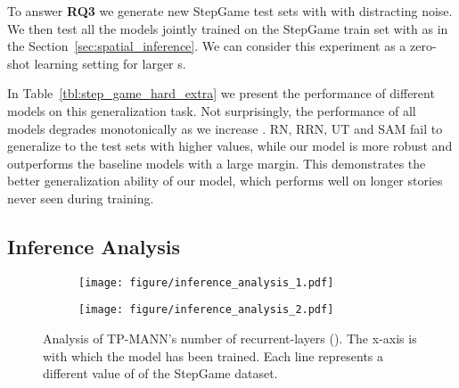 \documentclass[letterpaper]{article} \usepackage{aaai22}  \usepackage{times}  \usepackage{helvet}  \usepackage{courier}  \usepackage[hyphens]{url}  \usepackage{graphicx} \urlstyle{rm} \def\UrlFont{\rm}  \usepackage{natbib}  \usepackage{caption} \DeclareCaptionStyle{ruled}{labelfont=normalfont,labelsep=colon,strut=off} \frenchspacing  \setlength{\pdfpagewidth}{8.5in}  \setlength{\pdfpageheight}{11in}  \usepackage{algorithm}
\begin{document}
To answer \textbf{RQ3} 
we generate new StepGame test sets with  with distracting noise. 
We then test all the models jointly trained on the StepGame train set with  as in the Section~\ref{sec:spatial_inference}. We can consider this experiment as a zero-shot learning setting for larger s. 

In Table~\ref{tbl:step_game_hard_extra} we present the performance of different models on this generalization task. Not surprisingly, the performance of all models degrades monotonically as we increase . RN, RRN, UT and SAM fail to generalize to the test sets with higher  values, while our model is more robust and outperforms the baseline models with a large margin. This demonstrates the better generalization ability of our model, which performs well on longer stories never seen during training. 

\subsection{Inference Analysis}




\begin{figure}[!t]
\centering
\begin{subfigure}
        \centering
        \texttt{[image: figure/inference\_analysis\_1.pdf]}
        \label{fig:sub1}
    \end{subfigure}
\begin{subfigure}
        \centering
        \texttt{[image: figure/inference\_analysis\_2.pdf]}
        \label{fig:sub2}
    \end{subfigure}
\caption{Analysis of TP-MANN's number of recurrent-layers (). The x-axis is  with which the model has been trained. Each line represents a different value of  of the StepGame dataset.}
\label{fig:inference_analysis}
\end{figure}
\end{document}
